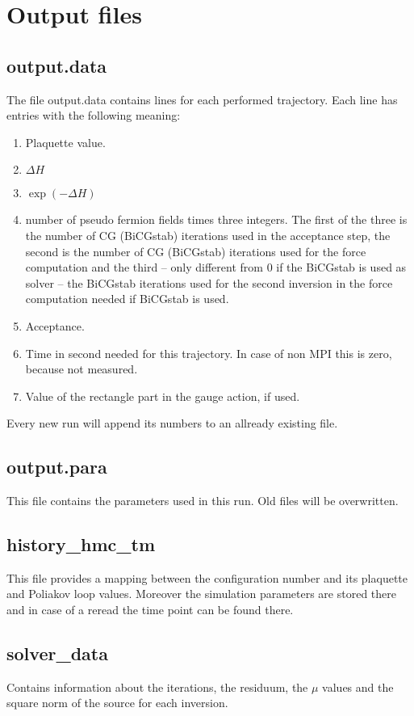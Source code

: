 \section{Output files}

\subsection*{\ttfamily output.data}

The file {\ttfamily output.data} contains lines for each performed
trajectory. Each line has entries with the following meaning:
\begin{enumerate}
\item Plaquette value.
\item $\Delta H$
\item $\exp(-\Delta H)$
\item number of pseudo fermion fields times three integers. The first
  of the three is the number of CG (BiCGstab)  iterations used in the acceptance
  step, the second is the number of CG (BiCGstab) iterations used for
  the force computation and the third -- only different from $0$ if
  the BiCGstab is used as solver -- the BiCGstab iterations used for
  the second inversion in the force computation needed if BiCGstab is
  used.
\item Acceptance.
\item Time in second needed for this trajectory. In case of non MPI
  this is zero, because not measured.
\item Value of the rectangle part in the gauge action, if used.
\end{enumerate}
Every new run will append its numbers to an allready existing file.

\subsection*{\ttfamily output.para}
This file contains the parameters used in this run. Old files will be
overwritten. 

\subsection*{\ttfamily history\_hmc\_tm}
This file provides a mapping between the configuration number and its
plaquette and Poliakov loop values. Moreover the simulation parameters
are stored there and in case of a reread the time point can be found there. 

\subsection*{\ttfamily solver\_data}
Contains information about the iterations, the residuum, the $\mu$
values and the square norm of the source for each inversion.

